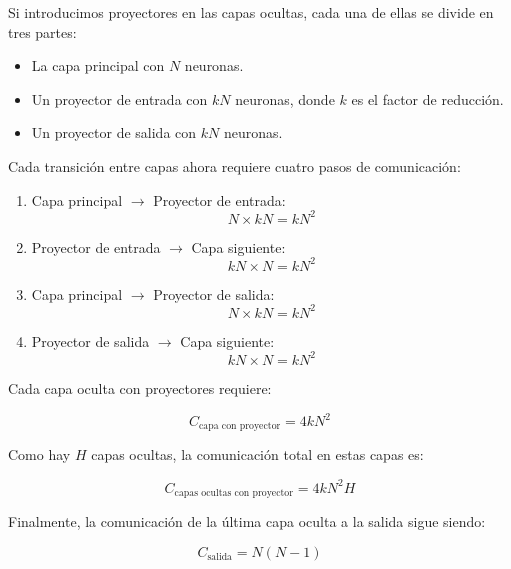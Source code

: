 \documentclass{article}
\begin{document}
Si introducimos proyectores en las capas ocultas, cada una de ellas se divide en tres partes:
\begin{itemize}
    \item La capa principal con \( N \) neuronas.
    \item Un proyector de entrada con \( kN \) neuronas, donde \( k \) es el factor de reducción.
    \item Un proyector de salida con \( kN \) neuronas.
\end{itemize}

Cada transición entre capas ahora requiere cuatro pasos de comunicación:

\begin{enumerate}
    \item Capa principal \( \rightarrow \) Proyector de entrada: 
        \begin{equation} 
        N \times kN = kN^2 
        \end{equation}
    \item Proyector de entrada \( \rightarrow \) Capa siguiente: 
        \begin{equation} 
        kN \times N = kN^2 
        \end{equation}
    \item Capa principal \( \rightarrow \) Proyector de salida: 
        \begin{equation} 
        N \times kN = kN^2 
        \end{equation}
    \item Proyector de salida \( \rightarrow \) Capa siguiente: 
        \begin{equation} 
        kN \times N = kN^2 
        \end{equation}
\end{enumerate}

Cada capa oculta con proyectores requiere:

\begin{equation}
C_{\text{capa con proyector}} = 4kN^2
\end{equation}

Como hay \( H \) capas ocultas, la comunicación total en estas capas es:

\begin{equation}
C_{\text{capas ocultas con proyector}} = 4kN^2 H
\end{equation}

Finalmente, la comunicación de la última capa oculta a la salida sigue siendo:

\begin{equation}
C_{\text{salida}} = N(N-1)
\end{equation}
\end{document}
